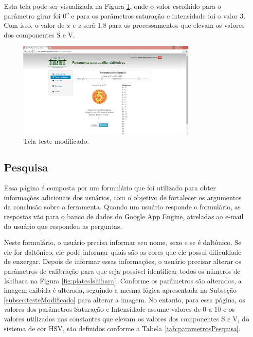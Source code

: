 \documentclass[	12pt, Times, openright, twoside, a4paper, english, brazil]{abntex2}
\begin{document}
Esta tela pode ser visualizada na Figura \ref{fig:telaTesteModificado}, onde o valor escolhido para o parâmetro girar foi $0^o$ e para os parâmetros saturação e intensidade foi o valor $3$. Com isso, o valor de $x$ e $z$ será $1.8$ para os processamentos que elevam os valores dos componentes S e V.

\begin{figure}[!htb]
\centering \includegraphics[width=0.8\textwidth]{telaTesteModificado.jpg}
\caption{Tela teste modificado.} \label{fig:telaTesteModificado}
\end{figure}


\subsection{Pesquisa}
\label{subsec:pesquisa}

Essa página é composta por um formulário que foi utilizado para obter informações adicionais dos usuários, com o objetivo de fortalecer os argumentos da conclusão sobre a ferramenta. Quando um usuário responde o formulário, as respostas vão para o banco de dados do Google App Engine, atreladas ao e-mail do usuário que respondeu as perguntas.


Neste formulário, o usuário precisa informar seu nome, sexo e se é daltônico. Se ele for daltônico, ele pode informar quais são as cores que ele possui dificuldade de enxergar. Depois de informar essas informações, o usuário precisar alterar os parâmetros de calibração para que seja possível identificar todos os números de Ishihara na Figura \ref{fig:platesIshihara}. Conforme os parâmetros são alterados, a imagem exibida é alterada, seguindo a mesma lógica apresentada na Subseção \ref{subsec:testeModificado} para alterar a imagem. No entanto, para essa página, os valores dos parâmetros Saturação e Intensidade assume valores de 0 a 10 e os valores utilizados nas constantes que elevam os valores dos componentes S e V, do sistema de cor HSV, são definidos conforme a Tabela \ref{tab:parametrosPesquisa}. 
\end{document}
